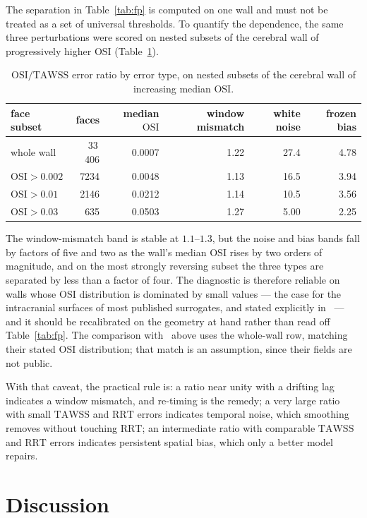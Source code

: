 \documentclass[11pt,a4paper]{article}
\newcommand{\TAWSS}{\mathrm{TAWSS}}
\newcommand{\OSI}{\mathrm{OSI}}
\newcommand{\RRT}{\mathrm{RRT}}
\begin{document}
The separation in Table~\ref{tab:fp} is computed on one wall and must not be
treated as a set of universal thresholds. To quantify the dependence, the
same three perturbations were scored on nested subsets of the cerebral wall
of progressively higher $\OSI$ (Table~\ref{tab:bands}).

\begin{table}[t]
\centering
\caption{$\OSI/\TAWSS$ error ratio by error type, on nested subsets of the
cerebral wall of increasing median $\OSI$.}
\label{tab:bands}
\begin{tabular}{l r r r r r}
\toprule
face subset & faces & median $\OSI$ & window mismatch & white noise & frozen bias\\
\midrule
whole wall    & 33\,406 & 0.0007 & 1.22 & 27.4 & 4.78\\
$\OSI>0.002$  & 7234    & 0.0048 & 1.13 & 16.5 & 3.94\\
$\OSI>0.01$   & 2146    & 0.0212 & 1.14 & 10.5 & 3.56\\
$\OSI>0.03$   & 635     & 0.0503 & 1.27 & 5.00 & 2.25\\
\bottomrule
\end{tabular}
\end{table}

The window-mismatch band is stable at $1.1$--$1.3$, but the noise and bias
bands fall by factors of five and two as the wall's median $\OSI$ rises by
two orders of magnitude, and on the most strongly reversing subset the three
types are separated by less than a factor of four. The diagnostic is
therefore reliable on walls whose $\OSI$ distribution is dominated by small
values --- the case for the intracranial surfaces of most published
surrogates, and stated explicitly in~\cite{rhsia2026} --- and it should be
recalibrated on the geometry at hand rather than read off Table~\ref{tab:fp}.
The comparison with~\cite{rhsia2026} above uses the whole-wall row, matching
their stated $\OSI$ distribution; that match is an assumption, since their
fields are not public.

With that caveat, the practical rule is: a ratio near unity with a drifting
lag indicates a window mismatch, and re-timing is the remedy; a very large
ratio with small $\TAWSS$ and $\RRT$ errors indicates temporal noise, which
smoothing removes without touching $\RRT$; an intermediate ratio with
comparable $\TAWSS$ and $\RRT$ errors indicates persistent spatial bias,
which only a better model repairs.

\section{Discussion}
\end{document}
